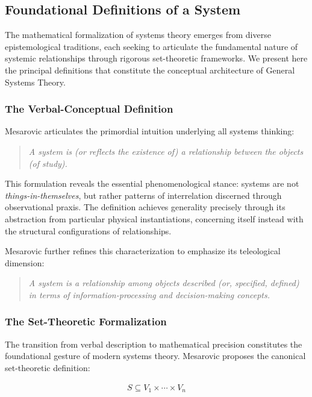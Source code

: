 \subsection{Foundational Definitions of a System}

The mathematical formalization of systems theory emerges from diverse epistemological traditions, each seeking to articulate the fundamental nature of systemic relationships through rigorous set-theoretic frameworks. We present here the principal definitions that constitute the conceptual architecture of General Systems Theory.

\subsubsection{The Verbal-Conceptual Definition}

Mesarovic \citep{Mesarovic1972} articulates the primordial intuition underlying all systems thinking:

\begin{quote}
\emph{A system is (or reflects the existence of) a relationship between the objects (of study).}
\end{quote}

This formulation reveals the essential phenomenological stance: systems are not \emph{things-in-themselves}, but rather patterns of interrelation discerned through observational praxis. The definition achieves generality precisely through its abstraction from particular physical instantiations, concerning itself instead with the structural configurations of relationships.

Mesarovic further refines this characterization to emphasize its teleological dimension:

\begin{quote}
\emph{A system is a relationship among objects described (or, specified, defined) in terms of information-processing and decision-making concepts.}
\end{quote}

\subsubsection{The Set-Theoretic Formalization}

The transition from verbal description to mathematical precision constitutes the foundational gesture of modern systems theory. Mesarovic \citep{Mesarovic1972} proposes the canonical set-theoretic definition:

\begin{align*}
S \subseteq V_1 \times \cdots \times V_n
\end{align*}

